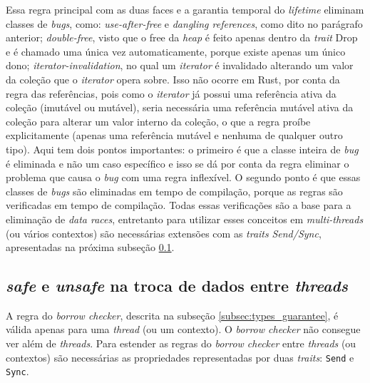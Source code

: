 Essa regra principal com as duas faces e a garantia temporal do \textit{lifetime} eliminam classes de \textit{bugs}, como: \textit{use-after-free} e \textit{dangling references}, como dito no parágrafo anterior; \textit{double-free}, visto que o free da \textit{heap} é feito apenas dentro da \textit{trait} Drop e é chamado uma única vez automaticamente, porque existe apenas um único dono; \textit{iterator-invalidation}, no qual um \textit{iterator} é invalidado alterando um valor da coleção que o \textit{iterator} opera sobre. Isso não ocorre em Rust, por conta da regra das referências, pois como o \textit{iterator} já possui uma referência ativa da coleção (imutável ou mutável), seria necessária uma referência mutável ativa da coleção para alterar um valor interno da coleção, o que a regra proíbe explicitamente (apenas uma referência mutável e nenhuma de qualquer outro tipo). Aqui tem dois pontos importantes: o primeiro é que a classe inteira de \textit{bug} é eliminada e não um caso específico e isso se dá por conta da regra eliminar o problema que causa o \textit{bug} com uma regra inflexível. O segundo ponto é que essas classes de \textit{bugs} são eliminadas em tempo de compilação, porque as regras são verificadas em tempo de compilação. Todas essas verificações são a base para a eliminação de \textit{data races}, entretanto para utilizar esses conceitos em \textit{multi-threads} (ou vários contextos) são necessárias extensões com as \textit{traits} \textit{Send/Sync}, apresentadas na próxima subseção \ref{subsec:send-sync-safe-unsafe}.

\subsection{\textit{safe} e \textit{unsafe} na troca de dados entre \textit{threads}}
\label{subsec:send-sync-safe-unsafe}

A regra do \textit{borrow checker}, descrita na subseção \ref{subsec:types_guarantee}, é válida apenas para uma \textit{thread} (ou um contexto). O \textit{borrow checker} não consegue ver além de \textit{threads}. Para estender as regras do \textit{borrow checker} entre \textit{threads} (ou contextos) são necessárias as propriedades representadas por duas \textit{traits}: \texttt{Send} e \texttt{Sync}.

